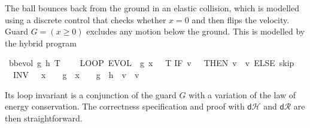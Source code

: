 \documentclass[envcountsame,envcountsect]{llncs}
\newcommand{\IF}[3]{\mathbf{if}\ #1\ \mathbf{then}\ #2\ \mathbf{else}\ #3}
\newcommand{\dH}{\mathsf{d}\mathcal{H}}
\newcommand{\dR}{\mathsf{d}\mathcal{R}}
\newcommand{\flow}{\varphi}
\newcommand{\reals}{\mathbb{R}}
\begin{document}
\begin{example}
The ball bounces back
from the ground in an elastic collision, which is modelled using a
discrete control that checks whether $x=0$ and then flips the
velocity.  Guard $G=(x\geq 0)$ excludes any motion
below the ground. This is modelled by the hybrid
program~\cite{Platzer18}
\begin{isabellebody}
\isanewline
{}\isamarkupfalse%
\ {\isachardoublequoteopen}bb{\isacharunderscore}evol\ g\ h\ T\ {\isasymequiv}\ \isanewline
\ \ LOOP\
{\isacharparenleft}EVOL\
{\isacharparenleft}{\isasymphi}\ g{\isacharparenright}\
{\isacharparenleft}x\ {\isasymge}\ {}{\isacharparenright}\
T{\isacharsemicolon} {\isacharparenleft}IF\ {\isacharparenleft}v\ {\isacharequal}\ {}{\isacharparenright}\ THEN\ {\isacharparenleft}v\ {\isacharcolon}{\isacharcolon}{\isacharequal}\ {\isacharminus}v{\isacharparenright}\ ELSE\ skip{\isacharparenright}{\isacharparenright}\ \isanewline
\ \   INV\ {\isacharparenleft}{}\ {\isasymle}\ x\ {\isasymand}\ {}\ {\isasymcdot}\ g\ {\isasymcdot}\ x\ {\isacharequal}\ {}\ {\isasymcdot}\ g\ {\isasymcdot}\ h\ {\isacharplus}\ v\ {\isasymcdot}\ v{\isacharparenright}{\isachardoublequoteclose}\isanewline
\end{isabellebody}
\noindent Its loop invariant is a conjunction of the guard $G$ with a
variation of the law of energy conservation. The correctness
specification and proof with $\dH$ and $\dR$ are then straightforward.

\end{example}
\end{document}
